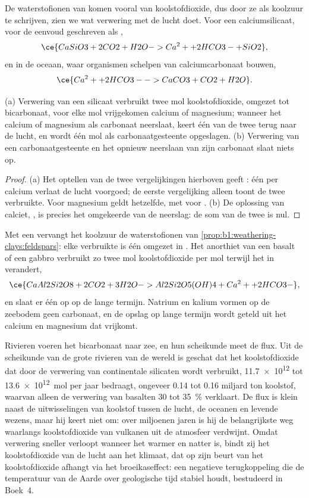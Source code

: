 De waterstofionen van  komen vooral van koolstofdioxide, dus door ze als koolzuur te schrijven, zien we wat verwering met de lucht doet. Voor een calciumsilicaat, voor de eenvoud geschreven als ,
\[
  \ce{CaSiO3 + 2 CO2 + H2O -> Ca^2+ + 2 HCO3- + SiO2},
\]
en in de oceaan, waar organismen schelpen van calciumcarbonaat bouwen,
\[
  \ce{Ca^2+ + 2 HCO3- -> CaCO3 + CO2 + H2O}.
\]

\begin{proposition}\label{prop:b1:weathering-clays:co2}
(a) Verwering van een silicaat verbruikt twee mol koolstofdioxide, omgezet tot bicarbonaat, voor elke mol vrijgekomen calcium of magnesium; wanneer het calcium of magnesium als carbonaat neerslaat, keert één van de twee terug naar de lucht, en wordt één mol als carbonaatgesteente opgeslagen. (b) Verwering van een carbonaatgesteente en het opnieuw neerslaan van zijn carbonaat slaat niets op.
\end{proposition}

\begin{proof}
(a) Het optellen van de twee vergelijkingen hierboven geeft : één  per calcium verlaat de lucht voorgoed; de eerste vergelijking alleen toont de twee verbruikte. Voor magnesium geldt hetzelfde, met  voor . (b) De oplossing van calciet, , is precies het omgekeerde van de neerslag: de som van de twee is nul.
\end{proof}

Met een  vervangt het koolzuur de waterstofionen van \cref{prop:b1:weathering-clays:feldspars}: elke verbruikte  is één  omgezet in . Het anorthiet van een basalt of een gabbro verbruikt zo twee mol koolstofdioxide per mol terwijl het in  verandert,
\[
  \ce{CaAl2Si2O8 + 2 CO2 + 3 H2O -> Al2Si2O5(OH)4 + Ca^2+ + 2 HCO3-},
\]
en slaat er één op op de lange termijn. Natrium en kalium vormen op de zeebodem geen carbonaat, en de opslag op lange termijn wordt geteld uit het calcium en magnesium dat vrijkomt.

Rivieren voeren het bicarbonaat naar zee, en hun scheikunde meet de flux.
Uit de scheikunde van de grote rivieren van de wereld is geschat dat het koolstofdioxide dat door de verwering van continentale silicaten wordt verbruikt, \num{11.7e12} tot \qty{13.6e12}{mol} per jaar bedraagt, ongeveer 0.14 tot 0.16 miljard ton koolstof, waarvan alleen de verwering van basalten 30 tot \qty{35}{\percent} verklaart. De flux is klein naast de uitwisselingen van koolstof tussen de lucht, de oceanen en levende wezens, maar hij keert niet om: over miljoenen jaren is hij de belangrijkste weg waarlangs koolstofdioxide van vulkanen uit de atmosfeer verdwijnt. Omdat verwering sneller verloopt wanneer het warmer en natter is, bindt zij het koolstofdioxide van de lucht aan het klimaat, dat op zijn beurt van het koolstofdioxide afhangt via het broeikaseffect: een negatieve terugkoppeling die de temperatuur van de Aarde over geologische tijd stabiel houdt, bestudeerd in Boek~4.

